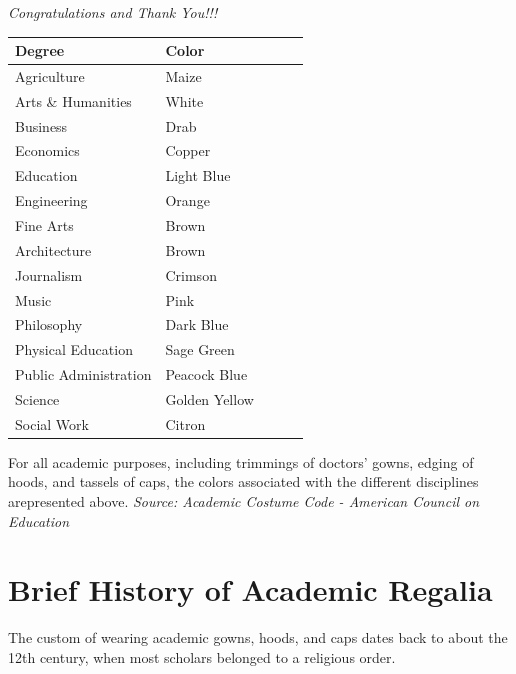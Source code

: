 \documentclass{tufte-handout}
\begin{document}
\begin{fullwidth}
\Huge{\textit{Congratulations and Thank You!!!}}
\end{fullwidth}

\renewcommand{\arraystretch}{1.5}
\begin{margintable}
\begin{tabular}{lllll}
\toprule
\textbf{Degree}                     & \textbf{Color}         \\
\midrule
Agriculture                     & Maize         \\
Arts \& Humanities             & White         \\
Business                           & Drab          \\
Economics                       & Copper        \\
Education                       & Light Blue    \\
Engineering                     & Orange        \\
Fine Arts                       & Brown         \\
Architecture                    & Brown         \\
Journalism                      & Crimson       \\
Music                           & Pink          \\
Philosophy                      & Dark Blue     \\
Physical Education              & Sage Green    \\
Public Administration           & Peacock Blue  \\
Science                         & Golden Yellow \\
Social Work                     & Citron \\
\hline
\end{tabular}
\caption{\linespread{1.3}\selectfont{}For all academic purposes, including trimmings of doctors' gowns, edging of hoods, and tassels of caps, the colors associated with the different disciplines arepresented above. \textit{Source: Academic Costume Code - American Council on Education}}
\end{margintable}
\renewcommand{\arraystretch}{1}

\section{Brief History of Academic Regalia}

The custom of wearing academic gowns, hoods, and caps dates back to about the 12th century, when most scholars belonged to a religious order.
\end{document}
